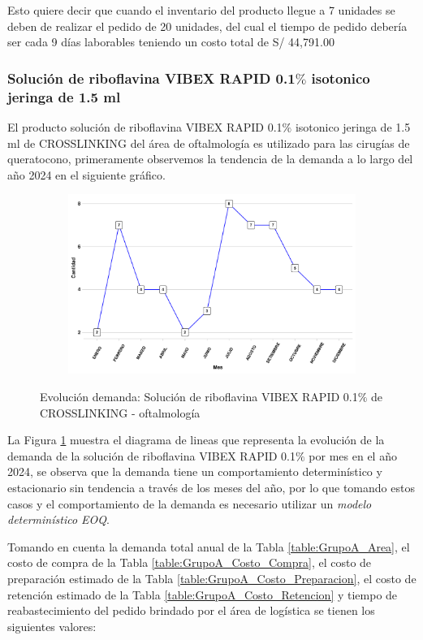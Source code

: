 Esto quiere decir que cuando el inventario del producto llegue a 7 unidades se deben de realizar el pedido de 20 unidades, del cual el tiempo de pedido debería ser cada 9 días laborables teniendo un costo total de S/ 44,791.00
\subsubsection{Solución de riboflavina VIBEX RAPID 0.1$\%$ isotonico jeringa de 1.5 ml}

El producto solución de riboflavina VIBEX RAPID 0.1$\%$ isotonico jeringa de 1.5 ml de CROSSLINKING del área de oftalmología es utilizado para las cirugías de queratocono, primeramente observemos la tendencia de la demanda a lo largo del año 2024 en el siguiente gráfico.

\begin{figure}[H]
  \caption{Evolución demanda: Solución de riboflavina VIBEX RAPID 0.1$\%$ de CROSSLINKING - oftalmología}
  {\includegraphics[width=15cm, height=5.85cm]{images/PROD007_demanda.pdf}}
  \label{fig:PROD007_demanda}
\end{figure}

La Figura \ref{fig:PROD007_demanda} muestra el diagrama de lineas que representa la evolución de la demanda de la solución de riboflavina VIBEX RAPID 0.1$\%$ por mes en el año 2024, se observa que la demanda tiene un comportamiento determinístico y estacionario sin tendencia a través de los meses del año, por lo que tomando estos casos y el comportamiento de la demanda es necesario utilizar un \textsl{modelo determinístico EOQ}.

Tomando en cuenta la demanda total anual de la Tabla \ref{table:GrupoA_Area}, el costo de compra de la Tabla \ref{table:GrupoA_Costo_Compra}, el costo de preparación estimado de la Tabla \ref{table:GrupoA_Costo_Preparacion}, el costo de retención estimado de la Tabla \ref{table:GrupoA_Costo_Retencion} y tiempo de reabastecimiento del pedido brindado por el área de logística se tienen los siguientes valores:


